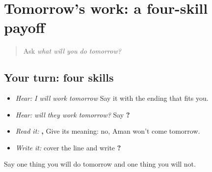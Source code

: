 \section[\texorpdfstring{\pa{ਤੁਸੀਂ} \pa{ਕੱਲ੍ਹ} \pa{ਕੀ} \pa{ਕਰੋਗੇ}? (tusīṁ kallh kī karoge?)}{ਤੁਸੀਂ ਕੱਲ੍ਹ ਕੀ ਕਰੋਗੇ? (tusīṁ kallh kī karoge?)}]{Tomorrow's work: a four-skill payoff}

\label{lesson:PA-C222-payoff}



\begin{quote}
Ask \emph{what will you do tomorrow?}
\end{quote}

\subsection*{Your turn: four skills}
\begin{itemize}
\raggedright
  \item \emph{Hear:} \emph{I will work tomorrow} Say it with the ending that fits you.
  \item \emph{Hear:} \emph{will they work tomorrow?} Say \textbf{    ?}
  \item \emph{Read it:} \textbf{ ,    } Give its meaning: no, Aman won't come tomorrow.
  \item \emph{Write it:} cover the line and write \textbf{   ?}
\end{itemize}

\begin{tcolorbox}[breakable,colback=teal!4,colframe=teal!35!black,title={Before you move on}]
Say one thing you will do tomorrow and one thing you will not.
\end{tcolorbox}
